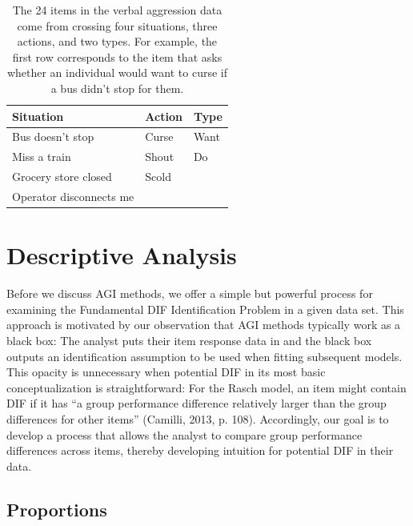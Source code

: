 \documentclass[
  english,
  man,floatsintext]{apa6}
\begin{document}
\begin{table}[h]
\caption{The 24 items in the verbal aggression data come from crossing four situations, three actions, and two types. For example, the first row corresponds to the item that asks whether an individual would want to curse if a bus didn’t stop for them.}
\centering
\begin{tabular}{|p{5cm}|p{3cm}|p{3cm}|}
\toprule
 \textbf{Situation} & \textbf{Action} & \textbf{Type} \\\midrule
 Bus doesn't stop & Curse & Want \\\hline
 Miss a train & Shout & Do  \\\hline
 Grocery store closed & Scold & \\\hline
 Operator disconnects me &  & \\ 
\bottomrule
\end{tabular}
\label{table:verbal}
\end{table}

\hypertarget{descriptive}{%
\section{Descriptive Analysis}\label{descriptive}}

Before we discuss AGI methods, we offer a simple but powerful process for examining the Fundamental DIF Identification Problem in a given data set. This approach is motivated by our observation that AGI methods typically work as a black box: The analyst puts their item response data in and the black box outputs an identification assumption to be used when fitting subsequent models. This opacity is unnecessary when potential DIF in its most basic conceptualization is straightforward: For the Rasch model, an item might contain DIF if it has ``a group performance difference relatively larger than the group differences for other items'' (Camilli, 2013, p. 108). Accordingly, our goal is to develop a process that allows the analyst to compare group performance differences across items, thereby developing intuition for potential DIF in their data.

\hypertarget{proportions}{%
\subsection{Proportions}\label{proportions}}
\end{document}
